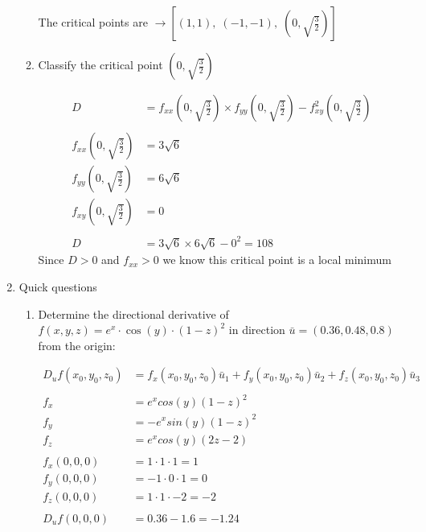 \documentclass[a4paper,11pt]{article}
\begin{document}
\begin{preview}
\begin{enumerate}
\begin{enumerate}
            The critical points are $\rightarrow [(1,1), \; (-1,-1), \; (0, \sqrt{\frac{3}{2}})]$

        \item Classify the critical point $(0,\sqrt{\frac{3}{2}})$
        
        \begin{align*}
            D &= f_{xx}(0, \sqrt{\frac{3}{2}}) \times f_{yy}(0, \sqrt{\frac{3}{2}}) - f_{xy}^2 (0, \sqrt{\frac{3}{2}})\\\\
            f_{xx}(0, \sqrt{\frac{3}{2}}) &= 3\sqrt{6}\\
            f_{yy}(0, \sqrt{\frac{3}{2}}) &= 6\sqrt{6}\\
            f_{xy}(0, \sqrt{\frac{3}{2}}) &= 0\\\\
            D &= 3\sqrt{6} \times 6\sqrt{6} - 0^2 = 108
        \end{align*}
        Since $D  > 0$ and $f_{xx} > 0$ we know this critical point is a local minimum\\
    
    \end{enumerate}

    \item Quick questions
    
    \begin{enumerate}
        \item Determine the directional derivative of $f(x,y,z) = e^x \cdot \cos(y) \cdot (1-z)^2$ in direction $\bar{u} =  (0.36, 0.48, 0.8)$ from the origin:
        
        \begin{align*}
            D_u f(x_0,y_0,z_0) &= f_x(x_0,y_0,z_0)\bar{u}_1 + f_y(x_0,y_0,z_0)\bar{u}_2 + f_z(x_0,y_0,z_0)\bar{u}_3\\\\
            f_{x} &= e^{x}cos(y)(1-z)^{2} \\
            f_{y} &= -e^{x}sin(y)(1-z)^2 \\
            f_{z} &= e^{x}cos(y)(2z - 2)\\\\
            f_x(0,0,0) &= 1\cdot 1 \cdot1 = 1\\
            f_y(0,0,0) &= -1 \cdot 0 \cdot 1 = 0\\
            f_z(0,0,0) &= 1 \cdot 1 \cdot -2 = -2\\\\
            D_u f(0,0,0) &= 0.36 -1.6 = -1.24\\
        \end{align*}


\end{enumerate}
\end{enumerate}
\end{preview}
\end{document}
